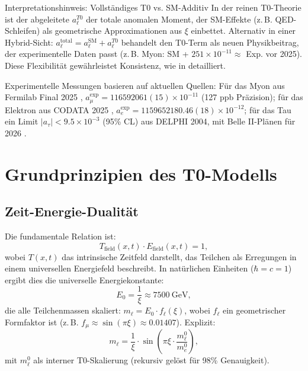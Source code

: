 \documentclass[12pt,a4paper]{article}
\begin{document}
	\begin{interpretation}{Interpretationshinweis: Vollständiges T0 vs. SM-Additiv}
		In der reinen T0-Theorie ist der abgeleitete $a_\ell^{T0}$ der totale anomalen Moment, der SM-Effekte (z.\,B. QED-Schleifen) als geometrische Approximationen aus $\xi$ einbettet. Alternativ in einer Hybrid-Sicht: $a_\ell^\text{total} = a_\ell^\text{SM} + a_\ell^{T0}$ behandelt den T0-Term als neuen Physikbeitrag, der experimentelle Daten passt (z.\,B. Myon: SM + $251 \times 10^{-11} \approx$ Exp. vor 2025). Diese Flexibilität gewährleistet Konsistenz, wie in \cite{T0_verhaeltnis_absolut} detailliert.
	\end{interpretation}
	
	Experimentelle Messungen basieren auf aktuellen Quellen: Für das Myon aus Fermilab Final 2025 \cite{Fermilab2025}, $a_\mu^\text{exp} = 116592061(15) \times 10^{-11}$ (127 ppb Präzision); für das Elektron aus CODATA 2025 \cite{CODATA2025}, $a_e^\text{exp} = 1159652180.46(18) \times 10^{-12}$; für das Tau ein Limit $|a_\tau| < 9.5 \times 10^{-3}$ (95\% CL) aus DELPHI 2004, mit Belle II-Plänen für 2026 \cite{BelleII2025}.
	
	\section{Grundprinzipien des T0-Modells}
	\subsection{Zeit-Energie-Dualität}
	Die fundamentale Relation ist:
	\begin{equation}
		T_\text{field}(x,t) \cdot E_\text{field}(x,t) = 1,
	\end{equation}
	wobei $T(x,t)$ das intrinsische Zeitfeld darstellt, das Teilchen als Erregungen in einem universellen Energiefeld beschreibt. In natürlichen Einheiten ($\hbar = c = 1$) ergibt dies die universelle Energiekonstante:
	\begin{equation}
		E_0 = \frac{1}{\xi} \approx \SI{7500}{\giga\electronvolt},
	\end{equation}
	die alle Teilchenmassen skaliert: $m_\ell = E_0 \cdot f_\ell(\xi)$, wobei $f_\ell$ ein geometrischer Formfaktor ist (z.\,B. $f_\mu \approx \sin(\pi \xi) \approx 0.01407$). Explizit:
	\begin{equation}
		m_\ell = \frac{1}{\xi} \cdot \sin\left(\pi \xi \cdot \frac{m_\ell^0}{m_e^0}\right),
	\end{equation}
	mit $m_\ell^0$ als interner T0-Skalierung (rekursiv gelöst für 98\% Genauigkeit).
	
\end{document}
